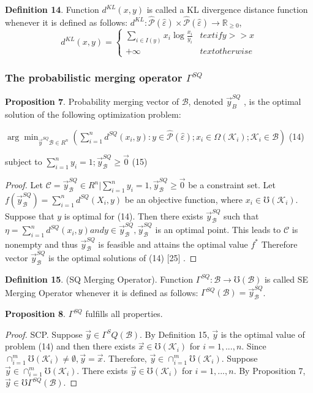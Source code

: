 \documentclass[]{iosart2c}
\begin{document}
\textbf{Definition 14}. Function $d^{KL}(x, y)$ is called a KL divergence distance function whenever it is defined as follows: $d^{KL} : \hat{\mathcal{P}} (\hat{\varepsilon}) \times \hat{\mathcal{P}} (\hat{\varepsilon}) \to \mathbb{R}_{\geq0}$, $$d^{KL}(x, y) =
\begin{cases}
	\sum_{i \in I(y)} {x_i \log{\frac{x_i}{y_i}}} &text{if} y >> x \\
	+\infty 	&text{otherwise}
\end{cases}
$$

\subsubsection{The probabilistic merging operator $\Gamma^{SQ}$}

\textbf{Proposition 7}. Probability merging vector of $\mathcal{B}$, denoted $\vec{y}^{SQ}_B$ , is the optimal solution of the following optimization problem:

$\arg \min_{\vec{y}^{SQ}\mathcal{B} \in R^n}\left( \sum^n_{i=1} d^{SQ}(x_i, y) : y \in \hat{\mathcal{P}} (\hat{\varepsilon});x_i \in \Omega(\mathcal{K}_i);\mathcal{K}_i \in \mathcal{B} \right)$ (14)

subject to $\sum^n_{i=1}y_i = 1;\vec{y}^{SQ}_\mathcal{B} \geq \vec{0}$ (15)

\begin{proof}Let $\mathcal{C} = {\vec{y}^{SQ}_\mathcal{B} \in R^n | \sum^n_{i=1}  y_i = 1, \vec{y}^{SQ}_\mathcal{B} \geq \vec{0}}$ be a constraint set. Let $f(\vec{y}^{SQ}_\mathcal{B} ) = \sum^n_{i=1} d^{SQ}(X_i, y)$ be an objective function, where $x_i \in \mho(\mathcal{K}_i)$. Suppose that $y$ is optimal for (14). Then there exists $\vec{y}^{SQ}_\mathcal{B}$ such that $\eta = \sum^n_{i=1} d^{SQ}(x_i, y) and y \in \vec{y}^{SQ}_\mathcal{B} , \vec{y}^{SQ}_\mathcal{B}$ is an optimal point. This leads to $\mathcal{C}$ is nonempty and thus $\vec{y}^{SQ}_\mathcal{B}$ is feasible and attains the optimal value $f^*$ Therefore vector $\vec{y}^{SQ}_\mathcal{B}$ is the optimal solutions of (14) [25] .
\end{proof}
\textbf{Definition 15}. (SQ Merging Operator). Function $\Gamma^{SQ} : \mathcal{B} \to \mho (\mathcal{B})$ is called SE Merging Operator whenever it is defined as follows: 
$\Gamma^{SQ}(\mathcal{B}) = \vec{y}^{SQ}_\mathcal{B}$.

\textbf{Proposition 8}. $\Gamma^{SQ}$ fulfills all properties.

\begin{proof}SCP. Suppose $\vec{y} \in \Gamma^SQ(\mathcal{B})$. By Definition 15, $\vec{y}$ is the optimal value of problem (14) and then there exists $\vec{x} \in \mho(\mathcal{K}_i)$ for $i = 1, ... , n$. Since $\cap^m_{i=1}\mho(\mathcal{K}_i) \neq \emptyset, \vec{y} = \vec{x}$. Therefore, $\vec{y} \in \cap^m_{i=1}\mho(\mathcal{K}_i)$. Suppose $\vec{y} \in \cap^m_{i=1}\mho(\mathcal{K}_i)$. There exists $\vec{y} \in \mho(\mathcal{K}_i)$ for $i = 1, ... , n$. By Proposition 7, $\vec{y} \in \mho\Gamma^{SQ}(\mathcal{B})$.
\end{proof}
\end{document}
